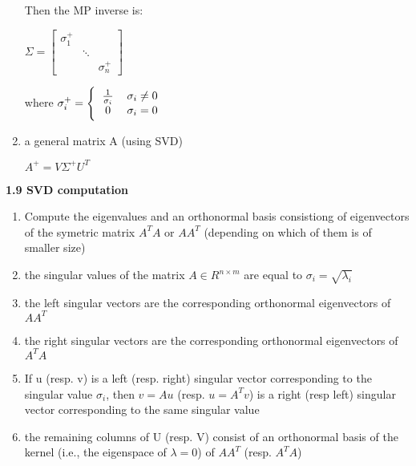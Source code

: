\documentclass{article}
\begin{document}
\begin{multicols}{2}
\begin{enumerate}
\begin{center}
		      \end{center}
		      Then the MP inverse is:
		      \begin{center}
			      \begin{math}
				      \Sigma =
				      \begin{bmatrix}
					      \sigma_1^+ &        &            \\
					                 & \ddots &            \\
					                 &        & \sigma_n^+
				      \end{bmatrix}
			      \end{math}
		      \end{center}
		      where \begin{math}
			      \sigma_i^+ =
			      \Bigg \{\begin{tabular}{ccc}
				      $\frac{1}{\sigma_i}$ & $\sigma_i \neq 0$ & \\
				      $0$                  & $\sigma_i = 0$    & \\
			      \end{tabular}
		      \end{math}
		\item a general matrix A (using SVD)
		      \begin{center}
			      \begin{math}
				      A^+ = V \Sigma^+ U^T
			      \end{math}
		      \end{center}
	\end{enumerate}

	\textbf{1.9 SVD computation}
	\begin{enumerate}
		\item Compute the eigenvalues and an orthonormal basis consistiong of eigenvectors
		      of the symetric matrix $A^TA$ or $AA^T$ (depending on which of them is of smaller size)
		\item the singular values of the matrix $A \in R^{n \times m}$ are equal to $\sigma_i = \sqrt{\lambda_i}$
		\item the left singular vectors are the corresponding orthonormal eigenvectors of $AA^T$
		\item the right singular vectors are the corresponding orthonormal eigenvectors of $A^TA$
		\item If u (resp. v) is a left (resp. right) singular vector corresponding to the singular
		      value $\sigma_i$, then $v = Au$ (resp. $u = A^Tv$) is a right (resp left) singular
		      vector corresponding to the same singular value
		\item the remaining columns of U (resp. V) consist of an orthonormal basis of the kernel
		      (i.e., the eigenspace of $\lambda = 0$) of $AA^T$ (resp. $A^TA$)
	\end{enumerate}


\end{multicols}
\end{document}
